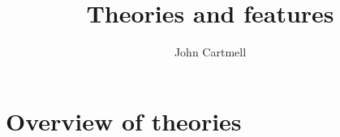 \documentclass[10pt,a4paper]{article}
\theoremstyle{remark}
\begin{document}
\title{Theories and features}


\author{John Cartmell}

\date{}


\newcommand{\seenudgeup}[1]{\rule{0.1cm}{#1}}
\newcommand{\seenudgedown}[1]{\rule[-#1]{0.1cm}{0.1cm}}
\newcommand{\nudgeup}[1]{\rule{0cm}{#1}}
\newcommand{\nudgedown}[1]{\rule[-#1]{0cm}{0.1cm}}

\newcommand{\stringtype}{text}
\newcommand{\numbertype}{number}


\section{Overview of theories}
\end{document}
